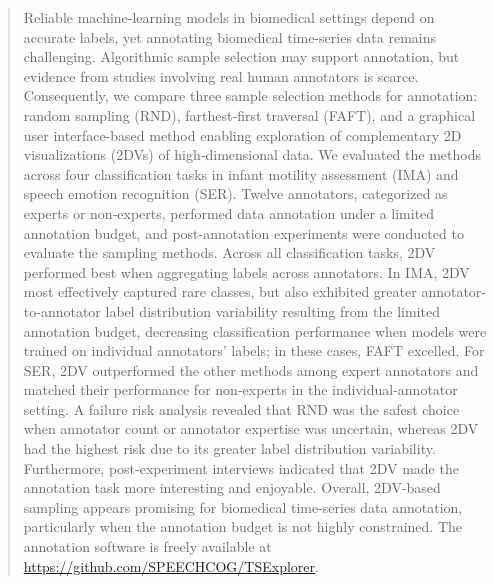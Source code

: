 \documentclass[a4paper,fleqn]{cas-dc}
\begin{document}
\begin{abstract}
Reliable machine-learning models in biomedical settings depend on accurate labels, yet annotating biomedical time-series data remains challenging. Algorithmic sample selection may support annotation, but evidence from studies involving real human annotators is scarce. Consequently, we compare three sample selection methods for annotation: random sampling (RND), farthest‑first traversal (FAFT), and a graphical user interface-based method enabling exploration of complementary 2D visualizations (2DVs) of high‑dimensional data. We evaluated the methods across four classification tasks in infant motility assessment (IMA) and speech emotion recognition (SER). Twelve annotators, categorized as experts or non‑experts, performed data annotation under a limited annotation budget, and post-annotation experiments were conducted to evaluate the sampling methods. Across all classification tasks, 2DV performed best when aggregating labels across annotators. In IMA, 2DV most effectively captured rare classes, but also exhibited greater annotator-to-annotator label distribution variability resulting from the limited annotation budget, decreasing classification performance when models were trained on individual annotators' labels; in these cases, FAFT excelled. For SER, 2DV outperformed the other methods among expert annotators and matched their performance for non‑experts in the individual-annotator setting. A failure risk analysis revealed that RND was the safest choice when annotator count or annotator expertise was uncertain, whereas 2DV had the highest risk due to its greater label distribution variability. Furthermore, post-experiment interviews indicated that 2DV made the annotation task more interesting and enjoyable. Overall, 2DV-based sampling appears promising for biomedical time-series data annotation, particularly when the annotation budget is not highly constrained. The annotation software is freely available at \url{https://github.com/SPEECHCOG/TSExplorer}.


\end{abstract}

\end{document}
